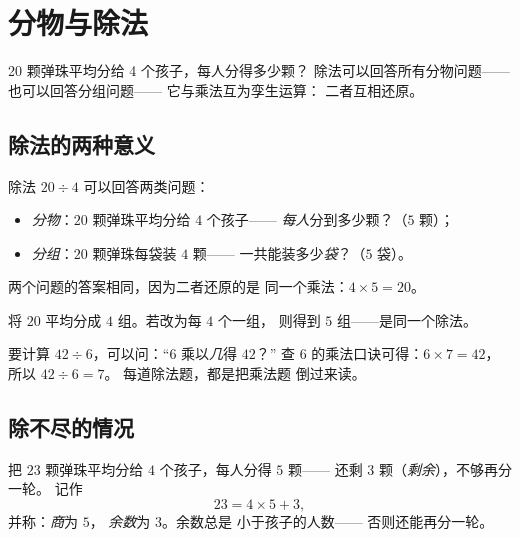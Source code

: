 \chapter{分物与除法}\label{ch:g3:division}

20 颗弹珠平均分给 4 个孩子，每人分得多少颗？
除法可以回答所有分物问题——也可以回答分组问题——
它与乘法互为孪生运算：
二者互相还原。

\section{除法的两种意义}

\begin{definition}[除法]\label{def:g3:division:def}
除法 $20 \div 4$ 可以回答两类问题：
\begin{itemize}
  \item \emph{分物}：$20$ 颗弹珠平均分给 $4$ 个孩子——
        \emph{每人}分到多少颗？（$5$ 颗）；
  \item \emph{分组}：$20$ 颗弹珠每袋装 $4$ 颗——
        一共能装多少\emph{袋}？（$5$ 袋）。
\end{itemize}
两个问题的答案相同，因为二者还原的是
同一个乘法：$4 \times 5 = 20$。
\end{definition}

\begin{omfigure}

{\small 将 $20$ 平均分成 $4$ 组。若改为每 $4$ 个一组，
则得到 $5$ 组——是同一个除法。}
\end{omfigure}

\begin{method}[用乘法口诀做除法]\label{met:g3:division:tables}
要计算 $42 \div 6$，可以问：“$6$ 乘以\emph{几}得 $42$？”
查 $6$ 的乘法口诀可得：$6 \times 7 = 42$，所以 $42 \div 6 = 7$。
每道除法题，都是把乘法题
倒过来读。
\end{method}

\section{除不尽的情况}

\begin{definition}[余数]\label{def:g3:division:remainder}
把 $23$ 颗弹珠平均分给 $4$ 个孩子，每人分得 $5$ 颗——
还剩 $3$ 颗（\emph{剩余}），不够再分一轮。
记作
\[
23 = 4 \times 5 + 3 ,
\]
并称：\emph{商}为 $5$，
\emph{余数}为 $3$。余数总是
小于孩子的人数——
否则还能再分一轮。
\end{definition}

